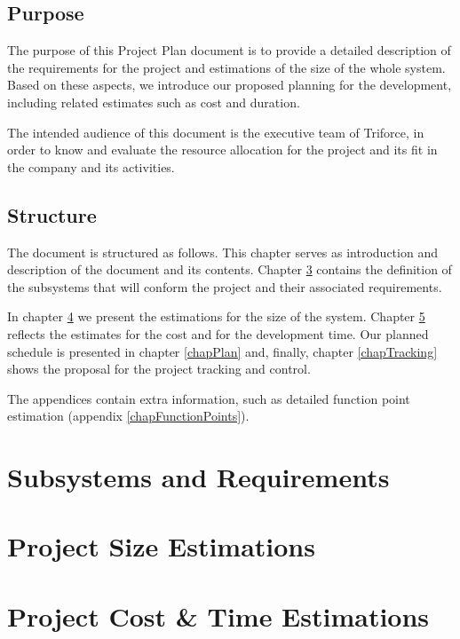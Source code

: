 \documentclass[11pt]{report}
\begin{document}
\section{Purpose}

The purpose of this Project Plan document is to provide a detailed description of the requirements for the project and estimations of the size of the whole system. Based on these aspects, we introduce our proposed planning for the development, including related estimates such as cost and duration.

The intended audience of this document is the executive team of Triforce, in order to know and evaluate the resource allocation for the project and its fit in the company and its activities.

\section{Structure}

The document is structured as follows. This chapter serves as introduction and description of the document and its contents. Chapter \ref{chapSubsystems} contains the definition of the subsystems that will conform the project and their associated requirements.

In chapter \ref{chapProjectSizeEstimations} we present the estimations for the size of the system. Chapter \ref{chapProjectCostTimeEstimationes} reflects the estimates for the cost and for the development time. Our planned schedule is presented in chapter \ref{chapPlan} and, finally, chapter \ref{chapTracking} shows the proposal for the project tracking and control.

The appendices contain extra information, such as detailed function point estimation (appendix \ref{chapFunctionPoints}).

\chapter{Subsystems and Requirements}
\label{chapSubsystems}



\chapter{Project Size Estimations}
\label{chapProjectSizeEstimations}


\chapter{Project Cost \& Time Estimations}
\label{chapProjectCostTimeEstimationes}

\end{document}
